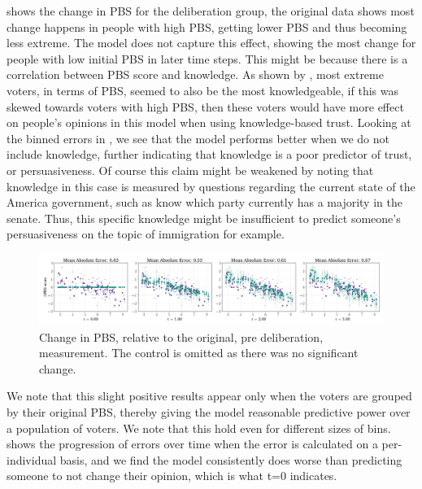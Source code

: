 \documentclass[11pt, oneside, dvipsnames]{Thesis} %
\begin{document}
 shows the change in  PBS for the deliberation group,
the original data shows most change happens in people with high  PBS,
getting lower PBS and thus becoming less extreme. The model does not capture
this effect, showing the most change for people with low initial  PBS in
later time steps. This might be because there is a correlation between PBS
score and knowledge. As shown by \citet{fishkinCanDeliberationHave2024}, most
extreme voters, in terms of PBS, seemed to also be the most knowledgeable, if
this was skewed towards voters with high PBS, then these voters would have more
effect on people's opinions in this model when using knowledge-based trust.
Looking at the binned errors in , we see that the model
performs better when we do not include knowledge, further indicating that
knowledge is a poor predictor of trust, or persuasiveness. Of course this claim
might be weakened by noting that knowledge in this case is measured by
questions regarding the current state of the America government, such as know
which party currently has a majority in the senate. Thus, this specific
knowledge might be insufficient to predict someone's persuasiveness on the
topic of immigration for example.


\begin{figure}
	\begin{center}
		\includegraphics[width=\textwidth]{Figures/change_pbs_scores.png}
	\end{center}
	\caption{Change in  PBS, relative to the original, pre deliberation, measurement. The control is  omitted as there was no significant change.}\label{fig:delta_pbs}
\end{figure}


We note that this slight positive results appear only when the voters are
grouped by their original PBS, thereby giving the model reasonable predictive
power over a population of voters. We note that this hold even for different
sizes of bins.  shows the progression of errors over
time when the error is calculated on a per-individual basis, and we find the
model consistently does worse than predicting someone to not change their
opinion, which is what t=0 indicates.
\end{document}
